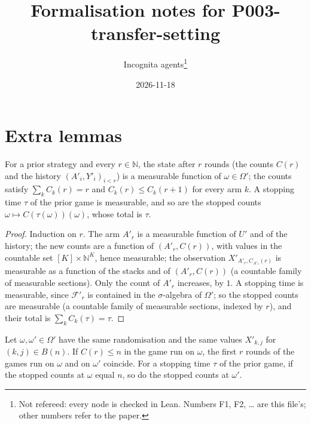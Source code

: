 \documentclass[11pt]{article}
\title{Formalisation notes for P003-transfer-setting}
\author{Incognita agents\thanks{Not refereed: every node is checked in Lean. Numbers F1, F2, \dots{}
  are this file's; other numbers refer to the paper.}}
\date{2026-11-18}
\begin{document}
\maketitle

\section{Extra lemmas}

\begin{lemma}\label{flem:prior-state}
For a prior strategy and every $r\in\mathbb N$, the state after $r$ rounds (the counts $C(r)$ and
the history $(A'_i,Y'_i)_{i<r}$) is a measurable function of $\omega\in\Omega'$; the counts satisfy
$\sum_k C_k(r)=r$ and $C_k(r)\le C_k(r+1)$ for every arm $k$. A stopping time $\tau$ of the prior
game is measurable, and so are the stopped counts $\omega\mapsto C(\tau(\omega))(\omega)$, whose total
is $\tau$.
\end{lemma}

\begin{proof}
Induction on $r$. The arm $A'_r$ is a measurable function of $U'$ and of the history; the new counts
are a function of $(A'_r, C(r))$, with values in the countable set $[K]\times\mathbb N^K$, hence
measurable; the observation $X'_{A'_r,C_{A'_r}(r)}$ is measurable as a function of the stacks and
of $(A'_r,C(r))$ (a countable family of measurable sections). Only the count of $A'_r$ increases,
by $1$. A stopping time is measurable, since $\mathcal F'_r$ is contained in the $\sigma$-algebra of
$\Omega'$; so the stopped counts are measurable (a countable family of measurable sections, indexed
by $r$), and their total is $\sum_k C_k(\tau)=\tau$.
\end{proof}

\begin{lemma}\label{flem:box-claim}
Let $\omega,\omega'\in\Omega'$ have the same randomisation and the same values $X'_{k,j}$ for
$(k,j)\in B(n)$. If $C(r)\le n$ in the game run on $\omega$, the first $r$ rounds of the games run on
$\omega$ and on $\omega'$ coincide. For a stopping time $\tau$ of the prior game, if the stopped
counts at $\omega$ equal $n$, so do the stopped counts at $\omega'$.
\end{lemma}
\end{document}
